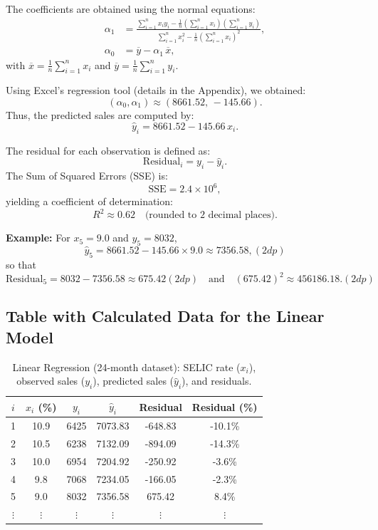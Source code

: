\documentclass{article}
\begin{document}
The coefficients are obtained using the normal equations:
\begin{align}
\alpha_1 &= \frac{\sum_{i=1}^{n} x_i y_i - \frac{1}{n}\left(\sum_{i=1}^{n} x_i\right)\left(\sum_{i=1}^{n} y_i\right)}
             {\sum_{i=1}^{n} x_i^2 - \frac{1}{n}\left(\sum_{i=1}^{n} x_i\right)^2}, \label{eq:alpha1}\\[2mm]
\alpha_0 &= \overline{y} - \alpha_1\,\overline{x}, \label{eq:alpha0}
\end{align}
with \(\overline{x}=\frac{1}{n}\sum_{i=1}^{n}x_i\) and \(\overline{y}=\frac{1}{n}\sum_{i=1}^{n}y_i\).

Using Excel's regression tool (details in the Appendix), we obtained:
\[
(\alpha_0,\alpha_1) \approx (8661.52,\,-145.66).
\]
Thus, the predicted sales are computed by:
\[
\hat{y}_i = 8661.52 - 145.66\, x_i.
\]

The residual for each observation is defined as:
\[
\text{Residual}_i = y_i - \hat{y}_i.
\]
The Sum of Squared Errors (SSE) is:
\[
\text{SSE}= 2.4 \times 10^6,
\]
yielding a coefficient of determination:
\[
R^2 \approx 0.62 \quad \text{(rounded to 2 decimal places)}.
\]

\textbf{Example:} For \(x_5 = 9.0\) and \(y_5 = 8032\),
\[
\hat{y}_5 = 8661.52 - 145.66 \times 9.0 \approx 7356.58, (2dp)
\]
so that
\[
\text{Residual}_5 = 8032 - 7356.58 \approx 675.42 (2dp)\quad \text{and} \quad (675.42)^2 \approx 456186.18. (2dp)
\]

\subsection*{Table with Calculated Data for the Linear Model}
\begin{table}[H]
\centering
\begin{tabular}{cccccc}
\toprule
\(i\) & \(x_i\) (\%) & \(y_i\) & \(\hat{y}_i\) & Residual & Residual (\%) \\
\midrule
1 & 10.9 & 6425 & 7073.83 & -648.83 & -10.1\% \\
2 & 10.5 & 6238 & 7132.09 & -894.09 & -14.3\% \\
3 & 10.0 & 6954 & 7204.92 & -250.92 & -3.6\% \\
4 & 9.8  & 7068 & 7234.05 & -166.05 & -2.3\% \\
5 & 9.0  & 8032 & 7356.58 & 675.42  & 8.4\% \\
\(\vdots\) & \(\vdots\) & \(\vdots\) & \(\vdots\) & \(\vdots\) & \(\vdots\) \\
\bottomrule
\end{tabular}
\caption{Linear Regression (24-month dataset): SELIC rate (\(x_i\)), observed sales (\(y_i\)), predicted sales (\(\hat{y}_i\)), and residuals.}
\label{tab:linear_regression}
\end{table}
\end{document}
